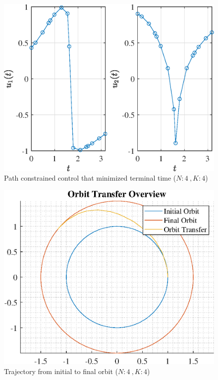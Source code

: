 \documentclass[]{article}
\begin{document}
\begin{figure}
	\centering
	\includegraphics[scale=0.75]{path_N4_K4_C3_tf.eps}
	\caption{Path constrained control that minimized terminal time (\(N:4\ , K:4\))}
	\label{fig:path_N4_K4_C3_tf}
\end{figure}
\begin{figure}
	\centering
	\includegraphics[scale=0.75]{orbit_N4_K4_C3_tf.eps}
	\caption{Trajectory from initial to final orbit (\(N:4\ , K:4\))}
	\label{fig:orbit_N4_K4_C3_tf}
\end{figure}
\end{document}
